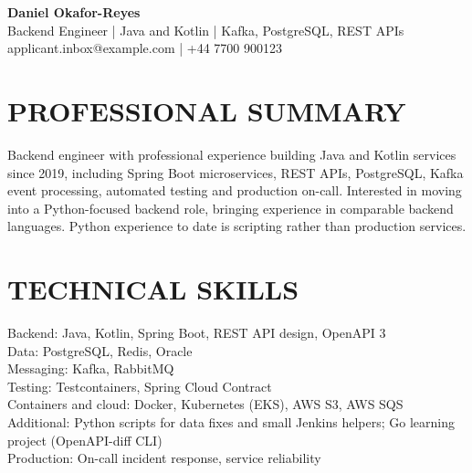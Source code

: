 \documentclass[11pt,a4paper]{article}
\begin{document}
\begin{center}
{\Huge\bfseries\color{primarycolor} Daniel Okafor-Reyes}\\[0.4em]
{\large Backend Engineer | Java and Kotlin | Kafka, PostgreSQL, REST APIs}\\[0.3em]
{\small applicant.inbox@example.com | +44 7700 900123}
\end{center}
\vspace{0.5em}

\section*{PROFESSIONAL SUMMARY}
Backend engineer with professional experience building Java and Kotlin services since 2019, including Spring Boot microservices, REST APIs, PostgreSQL, Kafka event processing, automated testing and production on-call. Interested in moving into a Python-focused backend role, bringing experience in comparable backend languages. Python experience to date is scripting rather than production services.

\section*{TECHNICAL SKILLS}
Backend: Java, Kotlin, Spring Boot, REST API design, OpenAPI 3\\
Data: PostgreSQL, Redis, Oracle\\
Messaging: Kafka, RabbitMQ\\
Testing: Testcontainers, Spring Cloud Contract\\
Containers and cloud: Docker, Kubernetes (EKS), AWS S3, AWS SQS\\
Additional: Python scripts for data fixes and small Jenkins helpers; Go learning project (OpenAPI-diff CLI)\\
Production: On-call incident response, service reliability
\end{document}
